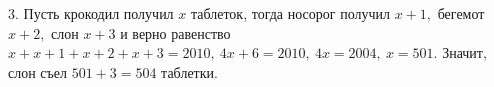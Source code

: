 3. Пусть крокодил получил $x$ таблеток, тогда носорог получил $x+1,$ бегемот $x+2,$ слон $x+3$ и верно равенство $x+x+1+x+2+x+3=2010,\ 4x+6=2010,\ 4x=2004,\ x=501.$ Значит, слон съел $501+3=504$ таблетки.\\
